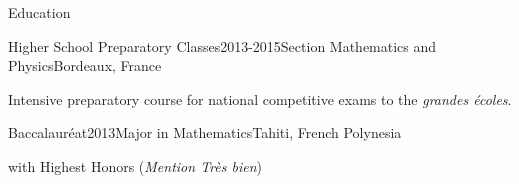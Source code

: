 \documentclass{resume} %
\begin{document}
\begin{rSection}{Education}
\begin{rSubsection}{Higher School Preparatory Classes}{2013-2015}{Section Mathematics and Physics}{Bordeaux, France}
    \item[] Intensive preparatory course for national competitive exams to the \emph{grandes écoles}.
\end{rSubsection}

\begin{rSubsection}{Baccalauréat}{2013}{Major in Mathematics}{Tahiti, French Polynesia}
    \item[] with Highest Honors (\emph{Mention Très bien})
    
\end{rSubsection}

\end{rSection}

\end{document}
